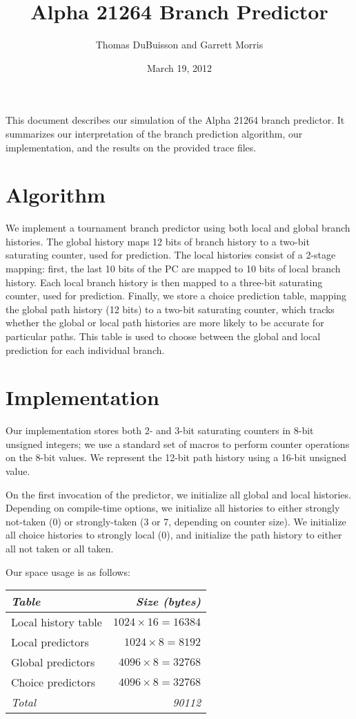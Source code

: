 \documentclass[11pt]{article}
\title{Alpha 21264 Branch Predictor}
\author{Thomas DuBuisson and Garrett Morris}
\date{March 19, 2012}
\begin{document}
\maketitle

This document describes our simulation of the Alpha 21264 branch predictor.  It summarizes our
interpretation of the branch prediction algorithm, our implementation, and the results on the
provided trace files.

\section{Algorithm}

We implement a tournament branch predictor using both local and global branch histories.  The global
history maps 12 bits of branch history to a two-bit saturating counter, used for prediction.  The
local histories consist of a 2-stage mapping: first, the last 10 bits of the PC are mapped to 10
bits of local branch history.  Each local branch history is then mapped to a three-bit saturating
counter, used for prediction.  Finally, we store a choice prediction table, mapping the global path
history (12 bits) to a two-bit saturating counter, which tracks whether the global or local path
histories are more likely to be accurate for particular paths.  This table is used to choose between
the global and local prediction for each individual branch.

\section{Implementation}

Our implementation stores both 2- and 3-bit saturating counters in 8-bit unsigned integers; we use a
standard set of macros to perform counter operations on the 8-bit values.  We represent the 12-bit
path history using a 16-bit unsigned value.

On the first invocation of the predictor, we initialize all global and local histories.  Depending
on compile-time options, we initialize all histories to either strongly not-taken (0) or
strongly-taken (3 or 7, depending on counter size).  We initialize all choice histories to strongly
local (0), and initialize the path history to either all not taken or all taken.

Our space usage is as follows:

\begin{tabular}{|l|r|}
\hline
\it Table & \it Size (bytes) \\
\hline
Local history table & $1024 \times 16 = 16384$ \\
Local predictors & $1024 \times 8 = 8192$ \\
Global predictors & $4096 \times 8 = 32768$ \\
Choice predictors & $4096 \times 8 = 32768$ \\
\it Total & \it 90112 \\
\hline
\end{tabular}
\end{document}

